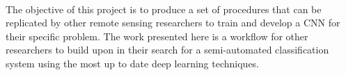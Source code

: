 \paragraph{}
The objective of this project is to produce a set of procedures that can be replicated by other remote sensing researchers to train and develop a CNN for their specific problem. The work presented here is a workflow for other researchers to build upon in their search for a semi-automated classification system using the most up to date deep learning techniques.
 



